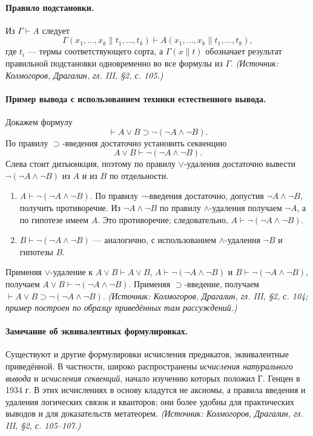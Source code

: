 \documentclass[a4paper,12pt]{article}
\begin{document}
\paragraph{Правило подстановки.} Из \(\Gamma\vdash A\) следует
\[
\Gamma(x_1,\ldots,x_k\|t_1,\ldots,t_k)\vdash A(x_1,\ldots,x_k\|t_1,\ldots,t_k),
\]
где \(t_i\) — термы соответствующего сорта, а \(\Gamma(x\|t)\) обозначает результат правильной подстановки одновременно во все формулы из \(\Gamma\).
\textit{(Источник: Колмогоров, Драгалин, гл. III, §2, с. 105.)}

\paragraph{Пример вывода с использованием техники естественного вывода.} Докажем формулу
\[
\vdash A\vee B\supset\neg(\neg A\wedge\neg B).
\]
По правилу \(\supset\)-введения достаточно установить секвенцию
\[
A\vee B\vdash\neg(\neg A\wedge\neg B).
\]
Слева стоит дизъюнкция, поэтому по правилу \(\vee\)-удаления достаточно вывести \(\neg(\neg A\wedge\neg B)\) из \(A\) и из \(B\) по отдельности.
\begin{enumerate}[label=\arabic*)]
\item \(A\vdash\neg(\neg A\wedge\neg B)\). По правилу \(\neg\)-введения достаточно, допустив \(\neg A\wedge\neg B\), получить противоречие. Из \(\neg A\wedge\neg B\) по правилу \(\wedge\)-удаления получаем \(\neg A\), а по гипотезе имеем \(A\). Это противоречие; следовательно, \(A\vdash\neg(\neg A\wedge\neg B)\).
\item \(B\vdash\neg(\neg A\wedge\neg B)\) — аналогично, с использованием \(\wedge\)-удаления \(\neg B\) и гипотезы \(B\).
\end{enumerate}
Применяя \(\vee\)-удаление к \(A\vee B\vdash A\vee B\), \(A\vdash\neg(\neg A\wedge\neg B)\) и \(B\vdash\neg(\neg A\wedge\neg B)\), получаем \(A\vee B\vdash\neg(\neg A\wedge\neg B)\). Применяя \(\supset\)-введение, получаем \(\vdash A\vee B\supset\neg(\neg A\wedge\neg B)\).
\textit{(Источник: Колмогоров, Драгалин, гл. III, §2, с. 104; пример построен по образцу приведённых там рассуждений.)}

\paragraph{Замечание об эквивалентных формулировках.} Существуют и другие формулировки исчисления предикатов, эквивалентные приведённой. В частности, широко распространены \emph{исчисления натурального вывода} и \emph{исчисления секвенций}, начало изучению которых положил Г. Генцен в 1934 г. В этих исчислениях в основу кладутся не аксиомы, а правила введения и удаления логических связок и кванторов; они более удобны для практических выводов и для доказательств метатеорем.
\textit{(Источник: Колмогоров, Драгалин, гл. III, §2, с. 105--107.)}
\end{document}
